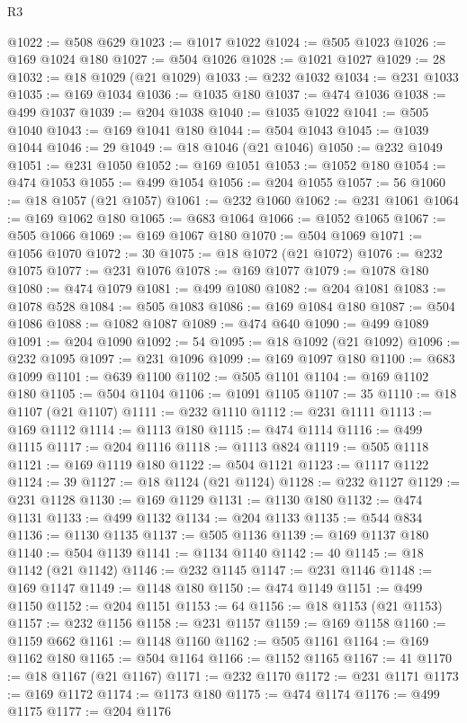 \begin{lexlean}{R3}
\begin{coremodule}
@1022 := @508 @629
@1023 := @1017 @1022
@1024 := @505 @1023
@1026 := @169 @1024 @180
@1027 := @504 @1026
@1028 := @1021 @1027
@1029 := 28
@1032 := @18 @1029 (@21 @1029)
@1033 := @232 @1032
@1034 := @231 @1033
@1035 := @169 @1034
@1036 := @1035 @180
@1037 := @474 @1036
@1038 := @499 @1037
@1039 := @204 @1038
@1040 := @1035 @1022
@1041 := @505 @1040
@1043 := @169 @1041 @180
@1044 := @504 @1043
@1045 := @1039 @1044
@1046 := 29
@1049 := @18 @1046 (@21 @1046)
@1050 := @232 @1049
@1051 := @231 @1050
@1052 := @169 @1051
@1053 := @1052 @180
@1054 := @474 @1053
@1055 := @499 @1054
@1056 := @204 @1055
@1057 := 56
@1060 := @18 @1057 (@21 @1057)
@1061 := @232 @1060
@1062 := @231 @1061
@1064 := @169 @1062 @180
@1065 := @683 @1064
@1066 := @1052 @1065
@1067 := @505 @1066
@1069 := @169 @1067 @180
@1070 := @504 @1069
@1071 := @1056 @1070
@1072 := 30
@1075 := @18 @1072 (@21 @1072)
@1076 := @232 @1075
@1077 := @231 @1076
@1078 := @169 @1077
@1079 := @1078 @180
@1080 := @474 @1079
@1081 := @499 @1080
@1082 := @204 @1081
@1083 := @1078 @528
@1084 := @505 @1083
@1086 := @169 @1084 @180
@1087 := @504 @1086
@1088 := @1082 @1087
@1089 := @474 @640
@1090 := @499 @1089
@1091 := @204 @1090
@1092 := 54
@1095 := @18 @1092 (@21 @1092)
@1096 := @232 @1095
@1097 := @231 @1096
@1099 := @169 @1097 @180
@1100 := @683 @1099
@1101 := @639 @1100
@1102 := @505 @1101
@1104 := @169 @1102 @180
@1105 := @504 @1104
@1106 := @1091 @1105
@1107 := 35
@1110 := @18 @1107 (@21 @1107)
@1111 := @232 @1110
@1112 := @231 @1111
@1113 := @169 @1112
@1114 := @1113 @180
@1115 := @474 @1114
@1116 := @499 @1115
@1117 := @204 @1116
@1118 := @1113 @824
@1119 := @505 @1118
@1121 := @169 @1119 @180
@1122 := @504 @1121
@1123 := @1117 @1122
@1124 := 39
@1127 := @18 @1124 (@21 @1124)
@1128 := @232 @1127
@1129 := @231 @1128
@1130 := @169 @1129
@1131 := @1130 @180
@1132 := @474 @1131
@1133 := @499 @1132
@1134 := @204 @1133
@1135 := @544 @834
@1136 := @1130 @1135
@1137 := @505 @1136
@1139 := @169 @1137 @180
@1140 := @504 @1139
@1141 := @1134 @1140
@1142 := 40
@1145 := @18 @1142 (@21 @1142)
@1146 := @232 @1145
@1147 := @231 @1146
@1148 := @169 @1147
@1149 := @1148 @180
@1150 := @474 @1149
@1151 := @499 @1150
@1152 := @204 @1151
@1153 := 64
@1156 := @18 @1153 (@21 @1153)
@1157 := @232 @1156
@1158 := @231 @1157
@1159 := @169 @1158
@1160 := @1159 @662
@1161 := @1148 @1160
@1162 := @505 @1161
@1164 := @169 @1162 @180
@1165 := @504 @1164
@1166 := @1152 @1165
@1167 := 41
@1170 := @18 @1167 (@21 @1167)
@1171 := @232 @1170
@1172 := @231 @1171
@1173 := @169 @1172
@1174 := @1173 @180
@1175 := @474 @1174
@1176 := @499 @1175
@1177 := @204 @1176

\end{coremodule}
\end{lexlean}
